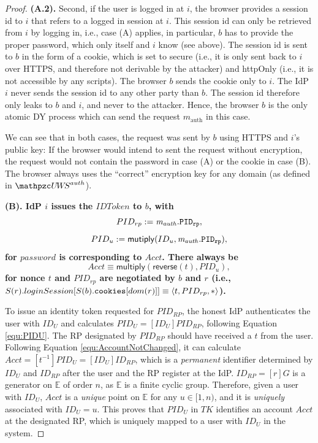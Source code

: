 \begin{theorem}
\begin{proof}
    \textbf{(A.2).} Second, if the user is logged in at $i$, the 
    browser provides a session id to $i$ that refers to a 
    logged in session at $i$. This session id can only be 
    retrieved from $i$ by logging in, i.e., case (A) applies, 
    in particular, $b$ has to provide the proper password, 
    which only itself and $i$ know (see above). The session id 
    is sent to $b$ in the form of a cookie, which is set to 
    secure (i.e., it is only sent back to $i$ over HTTPS, and
    therefore not derivable by the attacker) and httpOnly 
    (i.e., it is not accessible by any scripts). The browser $b$ 
    sends the cookie only to $i$. The IdP $i$ never sends the 
    session id to any other party than $b$. The session id 
    therefore only leaks to $b$ and $i$, and never to the 
    attacker. Hence, the browser $b$ is the only atomic DY 
    process which can send the request $m_\text{auth}$ in this case.
  
    We can see that in both cases, the request was sent by $b$ 
    using HTTPS and $i$'s public key: If the browser would 
    intend to sent the request without encryption, the request 
    would not contain the password in case (A) or the cookie in 
    case (B). The browser always uses the ``correct'' encryption 
    key for any domain (as defined in $\uppressoauthwebsystem$).
  
	\textbf{(B). IdP $i$ issues the $IDToken$ to $b$, with
    $$ PID_{rp} := \mathit{m_{auth}.\mathtt{PID_{rp}}}, $$ 
    $$ PID_u := \mathsf{mutiply}(ID_u, \mathit{m_{auth}.\mathtt{PID_{rp}}}), $$ 
    for $password$ is corresponding to $Acct$. There always be
	$$ Acct \equiv \mathsf{multiply}(\mathsf{reverse}(t), PID_u),$$
	for nonce $t$ and $PID_{rp}$ are negotiated by $b$ and $r$ (i.e., $S(r).loginSession[S(b).\mathtt{cookies}[dom(r)]] \equiv \langle t, PID_{rp}, *\rangle$).    
    }
    
    To issue an identity token requested for $PID_{RP}$, the honest IdP authenticates the user with $ID_U$ and calculates $PID_U = [ID_U]PID_{RP}$, following Equation \ref{equ:PIDU}. The RP designated by $PID_{RP}$ should have received a $t$ from the user. Following Equation \ref{equ:AccountNotChanged}, it can calculate $Acct = [t^{-1}]PID_{U} = [ID_U]ID_{RP}$, which is a \emph{permanent} identifier determined by $ID_U$ and $ID_{RP}$ after the user and the RP register at the IdP. $ID_{RP} = [r]G$ is a generator on $\mathbb{E}$ of order $n$, as $\mathbb{E}$ is a finite cyclic group. Therefore, given a user with $ID_U$, $Acct$ is a \emph{unique} point on $\mathbb{E}$ for any $u \in [1, n)$, and it is \emph{uniquely} associated with $ID_U=u$. 
This proves that $PID_U$ in $TK$ identifies an account $Acct$ at the designated RP, which is uniquely mapped to a user with $ID_U$ in the system.


\end{proof}
\end{theorem}

